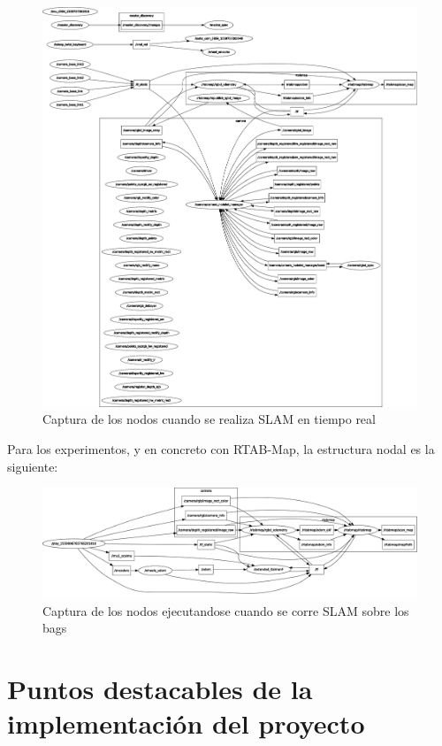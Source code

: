 \begin{figure}[!ht]
    \centering
    \includegraphics[width=.8\textwidth]{images/rqt_graphs/rpi_onboardSLAM.pdf}
    \caption{Captura de los nodos cuando se realiza SLAM en tiempo real}
    \label{rqt02}
\end{figure}

Para los experimentos, y en concreto con RTAB-Map, la estructura nodal es la siguiente:
\begin{figure}[!ht]
    \centering
    \includegraphics[width=.8\textwidth]{images/rqt_graphs/graph_RTABMAP.pdf}
    \caption{Captura de los nodos ejecutandose cuando se corre SLAM sobre los bags}
    \label{rqt03}
\end{figure}

\section{Puntos destacables de la implementación del proyecto}


